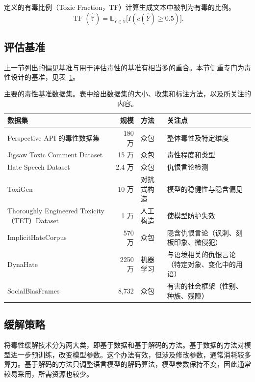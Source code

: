 定义的有毒比例（Toxic Fraction，TF）计算生成文本中被判为有毒的比例。
\begin{equation}
\operatorname{TF}(\widehat{\mathbb{Y}})
=\mathbb{E}_{\widehat{Y}\in\widehat{\mathbb{Y}}}
 \bigl[I(c(\widehat{Y})\geq0.5)\bigr].
\label{eq:ch06-tf}
\end{equation}

\subsection{评估基准}
上一节列出的偏见基准与用于评估毒性的基准有相当多的重合。本节侧重专门为毒性设计的基准，见表~\ref{tab:ch06-toxicity-benchmarks}。

\begin{table}[!htbp]
\centering
\caption{主要的毒性基准数据集。表中给出数据集的大小、收集和标注方法，以及所关注的内容。}
\label{tab:ch06-toxicity-benchmarks}
\small
\setlength{\tabcolsep}{3pt}
\begin{tabularx}{\linewidth}{@{}>{\raggedright\arraybackslash}p{.31\linewidth}rlX@{}}
\toprule
数据集 & 规模 & 方法 & 关注点\\
\midrule
Perspective API 的毒性数据集 & 180 万 & 众包 & 整体毒性及特定维度\\
Jigsaw Toxic Comment Dataset & 15 万 & 众包 & 毒性程度和类型\\
Hate Speech Dataset & 2.4 万 & 众包 & 仇恨言论检测\\
ToxiGen & 10 万 & 对抗式构造 & 模型的稳健性与隐含偏见\\
Thoroughly Engineered Toxicity（TET）Dataset & 1 万 & 人工构造 & 使模型防护失效\\
ImplicitHateCorpus & 570 万 & 众包 & 隐含仇恨言论（讽刺、刻板印象、微侵犯）\\
DynaHate & 2250 万 & 机器学习 & 与语境相关的仇恨言论（特定对象、变化中的用语）\\
SocialBiasFrames & 8,732 & 众包 & 有害的社会框架（性别、种族、残障）\\
\bottomrule
\end{tabularx}
\end{table}

\subsection{缓解策略}
将毒性缓解技术分为两大类，即基于数据和基于解码的方法。基于数据的方法对模型进一步预训练，改变模型参数。这个办法有效，但涉及修改参数，通常消耗较多算力。基于解码的方法只调整语言模型的解码算法，模型参数保持不变，因此通常较易采用，所需资源也较少。

